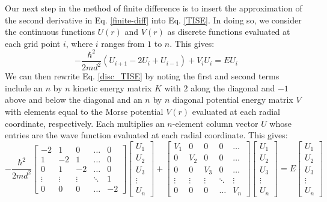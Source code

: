 \documentclass[%
aps, %
prl, %
preprint, %
12pt, %
amsfonts, %
amssymb, %
amsmath, %
endfloats,%
raggedbottom, %
]{revtex4-1}
\begin{document}
Our next step in the method of finite difference is to insert the approximation of the second 
derivative in Eq. \ref{finite-diff} into Eq. \ref{TISE}. In doing so, we consider the
continuous functions $U(r)$ and $V(r)$ as discrete functions evaluated at each grid point $i$,
where $i$ ranges from $1$ to $n$. This gives:
\begin{equation} \label{disc_TISE}
    -\frac{\hbar^2}{2md^2}(U_{i+1} - 2U_i + U_{i-1}) + V_iU_i = EU_i
\end{equation}
We can then rewrite Eq. \ref{disc_TISE} by noting the first and second terms include an $n$ by $n$
kinetic energy matrix $K$ with $2$ along the diagonal and $-1$ above and below the diagonal and an $n$ by $n$ diagonal potential energy matrix $V$ with elements equal to the Morse potential
$V(r)$ evaluated at each radial coordinate, respectively. Each multiplies an $n$-element column vector $U$ whose entries are the wave function evaluated at each radial coordinate. This gives:
\begin{equation} \label{big-matrix}
    -\frac{\hbar^2}{2md^2}\begin{bmatrix} 
    -2 & 1 & 0 & \dots & 0 \\
    1 & -2 & 1 & \dots & 0 \\
    0 & 1 & -2 & \dots & 0 \\
    \vdots & \vdots & \vdots & \ddots & 1 \\
    0 & 0 & 0 & \dots & -2
    \end{bmatrix}
    \begin{bmatrix}
        U_1 \\
        U_2 \\
        U_3 \\
        \vdots \\
        U_n
    \end{bmatrix} +
    \begin{bmatrix} 
    V_1 & 0 & 0 & 0 & \dots \\
    0 & V_2 & 0 & 0 & \dots \\
    0 & 0 & V_3 & 0 & \dots \\
    \vdots & \vdots & \vdots & \ddots & \vdots \\
    0 & 0 & 0 & \dots & V_n
    \end{bmatrix}
    \begin{bmatrix}
        U_1 \\
        U_2 \\
        U_3 \\
        \vdots \\
        U_n
    \end{bmatrix} =
    E\begin{bmatrix}
        U_1 \\
        U_2 \\
        U_3 \\
        \vdots \\
        U_n
    \end{bmatrix}
\end{equation}
\end{document}
